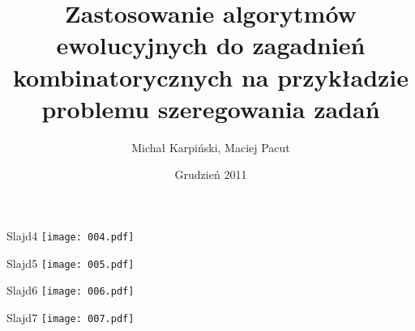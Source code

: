 \documentclass{beamer}
\title{Zastosowanie algorytmów ewolucyjnych do zagadnień kombinatorycznych na przykładzie problemu szeregowania zadań}
\author{Michał Karpiński, Maciej Pacut}
\date{Grudzień 2011}
\begin{document}
\maketitle
 
\begin{frame}{Slajd4}
  \texttt{[image: 004.pdf]}
\end{frame}

\begin{frame}{Slajd5}
  \texttt{[image: 005.pdf]}
\end{frame}

\begin{frame}{Slajd6}
  \texttt{[image: 006.pdf]}
\end{frame}

\begin{frame}{Slajd7}
  \texttt{[image: 007.pdf]}
\end{frame}
\end{document}
